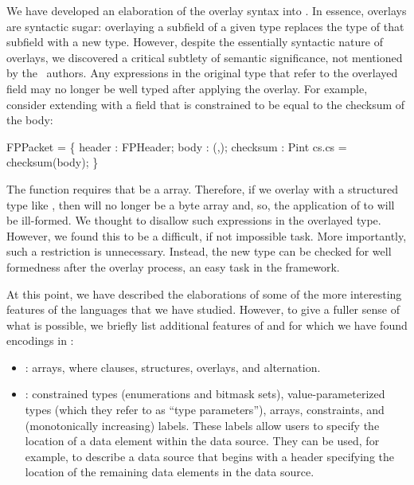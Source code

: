 We have developed an elaboration of the overlay syntax into \ddc{}. In
essence, overlays are syntactic sugar: overlaying a subfield of a
given type replaces the type of that subfield with a new type.
However, despite the essentially syntactic nature of overlays, we
discovered a critical subtlety of semantic significance, not mentioned
by the \packettypes\ authors. Any expressions in the original type that refer to the
overlayed field may no longer be well typed after applying the
overlay. For example, consider extending  with a field
that is constrained to be equal to the checksum of the body:
\begin{code}
FPPacket = \Pstruct \{
  header   : FPHeader;
  body     : \Pbyte \Parray{}(\Pnosep,\Peof);
  checksum : Pint \Pwhere{} cs.cs = checksum(body);
\}
\end{code}
\noindent
The  function requires that  be a 
array. Therefore, if we overlay  with a structured type like
, then  will no longer be a byte array and, so,
the application of  to  will be
ill-formed.  We thought to disallow such expressions in the overlayed
type. However, we found this to be a difficult, if not impossible
task.  More importantly, such a restriction is unnecessary.  Instead,
the new type can be checked for well formedness after the overlay
process, an easy task in the \ddc{} framework.

At this point, we have described the elaborations of some of the more
interesting features of the languages that we have studied. However,
to give a fuller sense of what is possible, we briefly list additional
features of \datascript{} and \packettypes{} for which we have found
encodings in \ddc{}:
\begin{itemize}
\item \packettypes{}: arrays, where clauses, structures, overlays,
  and alternation.
\item \datascript{}: constrained types (enumerations and bitmask
  sets), value-parameterized types (which they refer to as ``type
  parameters''), arrays, constraints, and (monotonically increasing)
  labels. These labels allow users to specify the location of a data
  element within the data source. They can be used, for example, to
  describe a data source that begins with a header specifying the
  location of the remaining data elements in the data source.
\end{itemize}

